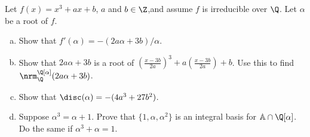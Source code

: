 \documentclass[11pt,letterpaper]{article}
\begin{document}
\begin{cproblem}{2.28}
    Let $f(x)=x^3+ax+b$, $a$ and $b\in \Z$,and assume $f$ is irreducible over $\Q$. Let $\alpha$ be a root of $f$.
    \begin{enumerate}[(a)]
        \item Show that $f'(\alpha)=-(2a\alpha+3b)/\alpha$. 
        \item Show that $2a\alpha+3b$ is a root of $\left(\frac{x-3b}{2a}\right)^3+a\left(\frac{x-3b}{2a}\right)+b$. Use this to find $\nrm^{\Q[\alpha]}_{\Q}(2a\alpha+3b)$.
        \item Show that $\disc(\alpha)=-(4a^3+27b^2)$.
        \item Suppose $\alpha^3=\alpha+1$. Prove that $\{1,\alpha,\alpha^2\}$ is an integral basis for $\mathbb{A}\cap \Q[\alpha]$. Do the same if $\alpha^3+\alpha=1$.   
    \end{enumerate}
\end{cproblem}
\end{document}
